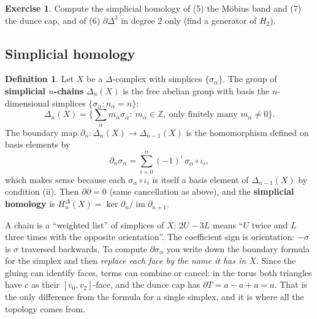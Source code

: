 \documentclass[11pt]{article}
\newcommand{\Z}{\mathbb Z}
\newcommand{\im}{\operatorname{im}}
\theoremstyle{definition}
\newtheorem{defn}[thm]{Definition}
\newtheorem{exercise}{Exercise}[section]
\begin{document}
\begin{exercise}\label{exr:gallery}
Compute the simplicial homology of (5) the Möbius band and (7) the dunce cap, and of (6) $\partial\Delta^3$ in degree $2$ only (find a generator of $H_2$).
\end{exercise}

\subsection{Simplicial homology}
\begin{defn}
Let $X$ be a $\Delta$-complex with simplices $\{\sigma_\alpha\}$. The group of \textbf{simplicial $n$-chains} $\Delta_n(X)$ is the free abelian group with basis the $n$-dimensional simplices $\{\sigma_\alpha:n_\alpha=n\}$:
\[\Delta_n(X)=\Big\{\textstyle\sum_\alpha m_\alpha\sigma_\alpha:\ m_\alpha\in\Z,\ \text{only finitely many }m_\alpha\neq0\Big\}.\]
The boundary map $\partial_n:\Delta_n(X)\to\Delta_{n-1}(X)$ is the homomorphism defined on basis elements by
\[\partial_n\sigma_\alpha=\sum_{i=0}^n(-1)^i\,\sigma_\alpha\circ\iota_i,\]
which makes sense because each $\sigma_\alpha\circ\iota_i$ is itself a basis element of $\Delta_{n-1}(X)$ by condition (ii). Then $\partial\partial=0$ (same cancellation as above), and the \textbf{simplicial homology} is $H^\Delta_n(X)=\ker\partial_n/\im\partial_{n+1}$.
\end{defn}
\begin{intuition}
A chain is a ``weighted list'' of simplices of $X$: $2U-3L$ means ``$U$ twice and $L$ three times with the opposite orientation''. The coefficient sign is orientation: $-\sigma$ is $\sigma$ traversed backwards. To compute $\partial\sigma_\alpha$ you write down the boundary formula for the simplex and then \emph{replace each face by the name it has in $X$}. Since the gluing can identify faces, terms can combine or cancel: in the torus both triangles have $c$ as their $[v_0,v_2]$-face, and the dunce cap has $\partial T=a-a+a=a$. That is the only difference from the formula for a single simplex, and it is where all the topology comes from.
\end{intuition}
\end{document}
